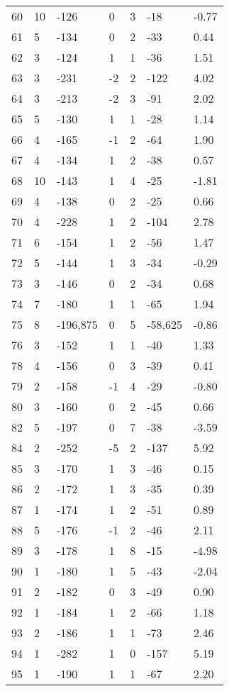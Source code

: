 \begin{appendices}
\begin{longtable}[c]{@{}lllllll@{}}
60 & 10 & -126 & 0 & 3 & -18 & -0.77 \\
61 & 5 & -134 & 0 & 2 & -33 & 0.44 \\
62 & 3 & -124 & 1 & 1 & -36 & 1.51 \\
63 & 3 & -231 & -2 & 2 & -122 & 4.02 \\
64 & 3 & -213 & -2 & 3 & -91 & 2.02 \\
65 & 5 & -130 & 1 & 1 & -28 & 1.14 \\
66 & 4 & -165 & -1 & 2 & -64 & 1.90 \\
67 & 4 & -134 & 1 & 2 & -38 & 0.57 \\
68 & 10 & -143 & 1 & 4 & -25 & -1.81 \\
69 & 4 & -138 & 0 & 2 & -25 & 0.66 \\
70 & 4 & -228 & 1 & 2 & -104 & 2.78 \\
71 & 6 & -154 & 1 & 2 & -56 & 1.47 \\
72 & 5 & -144 & 1 & 3 & -34 & -0.29 \\
73 & 3 & -146 & 0 & 2 & -34 & 0.68 \\
74 & 7 & -180 & 1 & 1 & -65 & 1.94 \\
75 & 8 & -196,875 & 0 & 5 & -58,625 & -0.86 \\
76 & 3 & -152 & 1 & 1 & -40 & 1.33 \\
78 & 4 & -156 & 0 & 3 & -39 & 0.41 \\
79 & 2 & -158 & -1 & 4 & -29 & -0.80 \\
80 & 3 & -160 & 0 & 2 & -45 & 0.66 \\
82 & 5 & -197 & 0 & 7 & -38 & -3.59 \\
84 & 2 & -252 & -5 & 2 & -137 & 5.92 \\
85 & 3 & -170 & 1 & 3 & -46 & 0.15 \\
86 & 2 & -172 & 1 & 3 & -35 & 0.39 \\
87 & 1 & -174 & 1 & 2 & -51 & 0.89 \\
88 & 5 & -176 & -1 & 2 & -46 & 2.11 \\
89 & 3 & -178 & 1 & 8 & -15 & -4.98 \\
90 & 1 & -180 & 1 & 5 & -43 & -2.04 \\
91 & 2 & -182 & 0 & 3 & -49 & 0.90 \\
92 & 1 & -184 & 1 & 2 & -66 & 1.18 \\
93 & 2 & -186 & 1 & 1 & -73 & 2.46 \\
94 & 1 & -282 & 1 & 0 & -157 & 5.19 \\
95 & 1 & -190 & 1 & 1 & -67 & 2.20 \\

\end{longtable}
\end{appendices}
